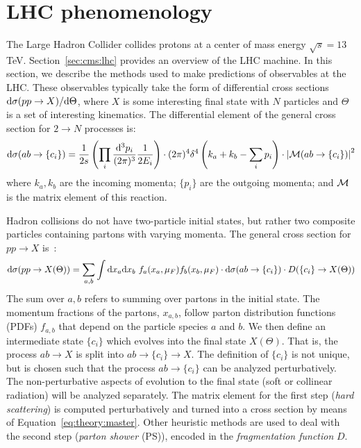 \section{LHC phenomenology}

The Large Hadron Collider collides protons at a center of mass energy $\sqrt{s} = 13$ TeV.
Section~\ref{sec:cms:lhc} provides an overview of the LHC machine.
In this section, we describe the methods used to make predictions of observables at the LHC.
These observables typically take the form of differential cross sections $\mathrm{d}\sigma(pp\rightarrow X)/\mathrm{d}\Theta$, where $X$ is some interesting final state with $N$ particles and $\Theta$ is a set of interesting kinematics.
The differential element of the general cross section for $2\rightarrow N$ processes is:
\begin{equation}
\mathrm{d}\sigma(ab\rightarrow \{c_i\}) = 
    \frac{1}{2s} \left(\prod_i \dfrac{\mathrm{d}^3p_i}{(2\pi)^3} \frac{1}{2E_i}\right) 
        \cdot (2\pi)^4 \delta^4\left(k_a + k_b - \sum_i p_i\right) 
        \cdot \left|\mathcal{M}(ab\rightarrow \{c_i\})\right|^2
        \label{eq:theory:2n}
\end{equation}
where $k_a,k_b$ are the incoming momenta; $\{p_i\}$ are the outgoing momenta; and $\mathcal{M}$ is the matrix element of this reaction.

Hadron collisions do not have two-particle initial states, but rather two composite particles containing partons with varying momenta. 
The general cross section for $pp\rightarrow X$ is~\cite{tasi009}:
\begin{equation}
\mathrm{d}\sigma(pp\rightarrow X(\Theta)) = 
    \sum_{a,b} \int \mathrm{d}x_a \mathrm{d}x_b 
    ~f_a(x_a,\mu_F) f_b(x_b,\mu_F) 
    \cdot \mathrm{d}\sigma(ab\rightarrow\{c_i\}) 
    \cdot D(\{c_i\}\rightarrow X(\Theta))
    \label{eq:theory:master}
\end{equation}
The sum over $a,b$ refers to summing over partons in the initial state.
The momentum fractions of the partons, $x_{a,b}$, follow parton distribution functions (PDFs) $f_{a,b}$ that depend on the particle species $a$ and $b$. 
We then define an intermediate state $\{c_i\}$ which evolves into the final state $X(\Theta)$.
That is, the process $ab\rightarrow X$ is split into $ab\rightarrow \{c_i\} \rightarrow X$.
The definition of $\{c_i\}$ is not unique, but is chosen such that the process $ab\rightarrow\{c_i\}$ can be analyzed perturbatively.
The non-perturbative aspects of evolution to the final state (soft or collinear radiation) will be analyzed separately. 
The matrix element for the first step (\emph{hard scattering}) is computed perturbatively and turned into a cross section by means of Equation~\ref{eq:theory:master}.
Other heuristic methods are used to deal with the second step (\emph{parton shower} (PS)), encoded in the \emph{fragmentation function} $D$. 

